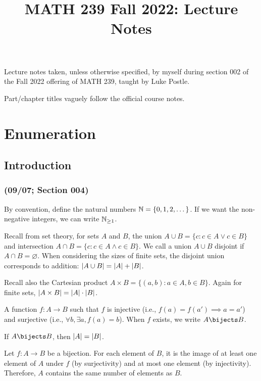 \documentclass[class=math239,notes,tikz]{agony}
\title{MATH 239 Fall 2022: Lecture Notes}
\begin{document}
\renewcommand{\contentsname}{MATH 239 Fall 2022:\\{\huge Lecture Notes}}
\thispagestyle{firstpage}
\tableofcontents

Lecture notes taken, unless otherwise specified,
by myself during section 002 of the Fall 2022 offering of MATH 239,
taught by Luke Postle.

Part/chapter titles vaguely follow the official course notes.

\part{Enumeration}

\chapter{Introduction}

\section{(09/07; Section 004)}

By convention, define the natural numbers $\mathbb{N} = \{0,1,2,\dotsc\}$.
If we want the non-negative integers, we can write $\mathbb{N}_{\geq1}$.

Recall from set theory, for sets $A$ and $B$,
the union $A \cup B = \{c : c \in A \lor c \in B\}$
and intersection $A \cap B = \{c : c \in A \land c \in B\}$.
We call a union $A \cup B$ disjoint if $A \cap B = \varnothing$.
When considering the sizes of finite sets,
the disjoint union corresponds to addition:
$\abs{A \cup B} = \abs{A} + \abs{B}$.

Recall also the Cartesian product $A \times B = \{(a,b) : a \in A, b \in B\}$.
Again for finite sets, $\abs{A \times B} = \abs{A} \cdot \abs{B}$.

\begin{defn}[bijection]
  A function $f : A \to B$ such that $f$ is injective (i.e., $f(a) = f(a') \implies a = a'$)
  and surjective (i.e., $\forall b, \exists a, f(a) = b$).
  When $f$ exists, we write $A \bijects B$.
\end{defn}

\begin{theorem}
  If $A \bijects B$, then $\abs{A} = \abs{B}$.
\end{theorem}
\begin{prf}
  Let $f : A \to B$ be a bijection.
  For each element of $B$, it is the image of
  at least one element of $A$ under $f$ (by surjectivity)
  and at most one element (by injectivity).
  Therefore, $A$ contains the same number of elements as $B$.
\end{prf}
\end{document}

